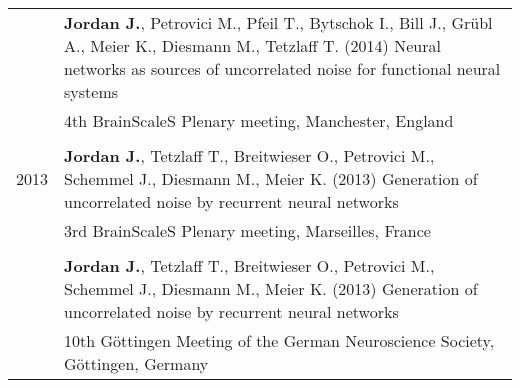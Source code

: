 \begin{longtable}{>{\hfill}p{1.6cm} p{}}
  & \textbf{Jordan J.}, Petrovici M., Pfeil T., Bytschok I., Bill J., Gr\"ubl A., Meier K., Diesmann M., Tetzlaff T. (2014) Neural networks as sources of uncorrelated noise for functional neural systems \\
  & \footnotesize 4th BrainScaleS Plenary meeting, Manchester, England \\
  \multicolumn{2}{c}{} \\
  2013 & \textbf{Jordan J.}, Tetzlaff T., Breitwieser O., Petrovici M., Schemmel J., Diesmann M., Meier K. (2013) Generation of uncorrelated noise by recurrent neural networks \\
  & \footnotesize 3rd BrainScaleS Plenary meeting, Marseilles, France \\
  \multicolumn{2}{c}{} \\
  & \textbf{Jordan J.}, Tetzlaff T., Breitwieser O., Petrovici M., Schemmel J., Diesmann M., Meier K. (2013) Generation of uncorrelated noise by recurrent neural networks \\
  & \footnotesize 10th G\"ottingen Meeting of the German Neuroscience Society, G\"ottingen, Germany \\
\end{longtable}

